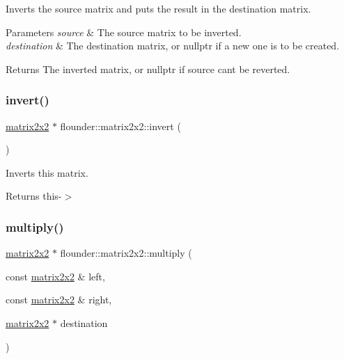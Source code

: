 Inverts the source matrix and puts the result in the destination matrix. 


\begin{DoxyParams}{Parameters}
{\em source} & The source matrix to be inverted. \\
\hline
{\em destination} & The destination matrix, or nullptr if a new one is to be created. \\
\hline
\end{DoxyParams}
\begin{DoxyReturn}{Returns}
The inverted matrix, or nullptr if source can\textquotesingle{}t be reverted. 
\end{DoxyReturn}
\mbox{\label{classflounder_1_1matrix2x2_a88dc423971ee40b21df08f8ae5b03d43}} 
\subsubsection{\texorpdfstring{invert()}{invert()}\hspace{0.1cm}{\footnotesize\ttfamily [2/2]}}
{\footnotesize\ttfamily \hyperlink{classflounder_1_1matrix2x2}{matrix2x2} $\ast$ flounder\+::matrix2x2\+::invert (\begin{DoxyParamCaption}{ }\end{DoxyParamCaption})}



Inverts this matrix. 

\begin{DoxyReturn}{Returns}
this-\/$>$ 
\end{DoxyReturn}
\mbox{\label{classflounder_1_1matrix2x2_ab038a15b43141ba85b9779ba3c772579}} 
\subsubsection{\texorpdfstring{multiply()}{multiply()}}
{\footnotesize\ttfamily \hyperlink{classflounder_1_1matrix2x2}{matrix2x2} $\ast$ flounder\+::matrix2x2\+::multiply (\begin{DoxyParamCaption}\item[{const \hyperlink{classflounder_1_1matrix2x2}{matrix2x2} \&}]{left,  }\item[{const \hyperlink{classflounder_1_1matrix2x2}{matrix2x2} \&}]{right,  }\item[{\hyperlink{classflounder_1_1matrix2x2}{matrix2x2} $\ast$}]{destination }\end{DoxyParamCaption})\hspace{0.3cm}{\ttfamily [static]}}



